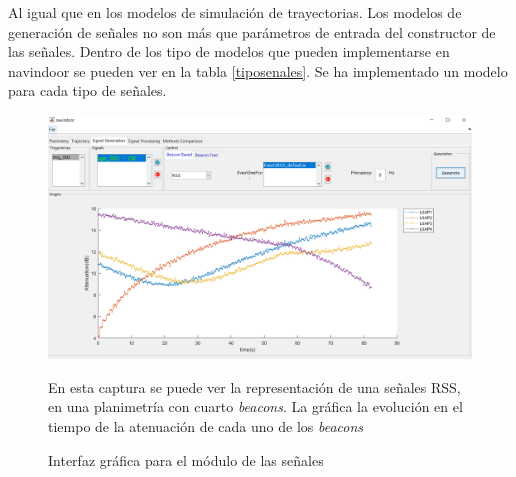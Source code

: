 Al igual que en los modelos de simulación de trayectorias. Los modelos de generación de señales no son más que parámetros de entrada del constructor de las señales. Dentro de los tipo de modelos que pueden implementarse en navindoor se pueden ver en la tabla \ref{tiposenales}. Se ha implementado un modelo para cada tipo de señales. 




\begin{figure}[!ht]
    \centering
    \includegraphics[width=0.8\columnwidth]{img/Design/3.PNG}
    \caption[]{Interfaz gráfica para el módulo de las señales}
    \footnotesize
    En esta captura se puede ver la representación de una señales RSS, en una planimetría con cuarto \emph{beacons}. La gráfica la evolución en el tiempo de la atenuación de cada uno de los \emph{beacons}
    \label{fig:interfaz3}
\end{figure}


